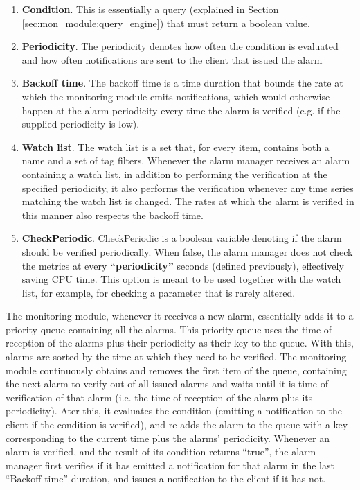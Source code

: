 \begin{enumerate}
    \item \textbf{Condition}. This is essentially a query (explained in Section \ref{sec:mon_module:query_engine}) that must return a boolean value.
    
    \item \textbf{Periodicity}. The periodicity denotes how often the condition is evaluated and how often notifications are sent to the client that issued the alarm
    
    \item \textbf{Backoff time}. The backoff time is a time duration that bounds the rate at which the monitoring module emits notifications, which would otherwise happen at the alarm periodicity every time the alarm is verified (e.g. if the supplied periodicity is low).
    
    \item \textbf{Watch list}. The watch list is a set that, for every item, contains both a name and a set of tag filters. Whenever the alarm manager receives an alarm containing a watch list, in addition to performing the verification at the specified periodicity, it also performs the verification whenever any time series matching the watch list is changed. The rates at which the alarm is verified in this manner also respects the backoff time.
    
    \item \textbf{CheckPeriodic}. CheckPeriodic is a boolean variable denoting if the alarm should be verified periodically. When false, the alarm manager does not check the metrics at every \textbf{``periodicity''} seconds (defined previously), effectively saving CPU time. This option is meant to be used together with the watch list, for example, for checking a parameter that is rarely altered.
    
\end{enumerate}

The monitoring module, whenever it receives a new alarm, essentially adds it to a priority queue containing all the alarms. This priority queue uses the time of reception of the alarms plus their periodicity as their key to the queue. With this, alarms are sorted by the time at which they need to be verified. The monitoring module continuously obtains and removes the first item of the queue, containing the next alarm to verify out of all issued alarms and waits until it is time of verification of that alarm (i.e. the time of reception of the alarm plus its periodicity). Ater this, it evaluates the condition (emitting a notification to the client if the condition is verified), and re-adds the alarm to the queue with a key corresponding to the current time plus the alarms' periodicity. Whenever an alarm is verified, and the result of its condition returns ``true'', the alarm manager first verifies if it has emitted a notification for that alarm in the last ``Backoff time'' duration, and issues a notification to the client if it has not.